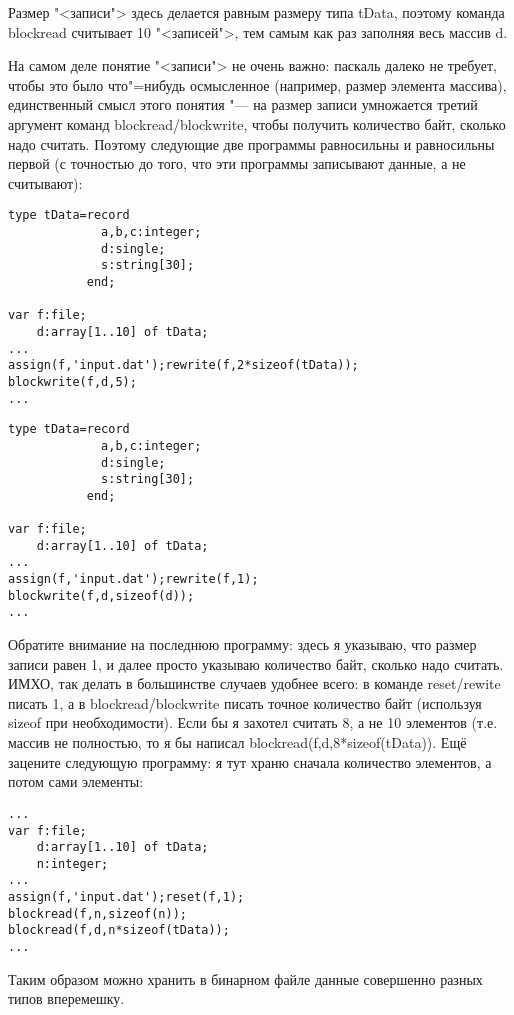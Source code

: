 Размер "<записи"> здесь делается равным размеру типа tData, поэтому команда blockread считывает 10 
"<записей">, тем самым как раз заполняя весь массив d.

\pagebreak[3]

На самом деле понятие "<записи"> не очень важно: паскаль далеко не требует, чтобы это было 
что"=нибудь осмысленное (например, размер элемента массива), единственный смысл этого понятия "--- 
на размер записи умножается третий аргумент команд blockread/blockwrite, чтобы получить количество 
байт, сколько надо считать. Поэтому следующие две программы равносильны и равносильны первой (с 
точностью до того, что эти программы записывают данные, а не считывают):
\begin{codesample}\begin{verbatim}
type tData=record
             a,b,c:integer;
             d:single;
             s:string[30];
           end;
           
var f:file;
    d:array[1..10] of tData;
...  
assign(f,'input.dat');rewrite(f,2*sizeof(tData));
blockwrite(f,d,5);
...
\end{verbatim}\end{codesample}
\begin{codesample}\begin{verbatim}
type tData=record
             a,b,c:integer;
             d:single;
             s:string[30];
           end;
           
var f:file;
    d:array[1..10] of tData;
...  
assign(f,'input.dat');rewrite(f,1);
blockwrite(f,d,sizeof(d));
...
\end{verbatim}\end{codesample}

Обратите внимание на последнюю программу: здесь я указываю, что размер записи равен 1, и далее 
просто указываю количество байт, сколько надо считать. ИМХО, так делать в большинстве случаев 
удобнее всего: в команде reset/rewite писать 1, а в blockread/blockwrite писать точное количество 
байт (используя sizeof при необходимости). Если бы я захотел считать 8, а не 10 элементов (т.е. 
массив не полностью, то я бы написал blockread(f,d,8*sizeof(tData)). Ещё зацените следующую 
программу: я тут храню сначала количество элементов, а потом сами элементы:
\begin{codesample}\begin{verbatim}
...
var f:file;
    d:array[1..10] of tData;
    n:integer;
...  
assign(f,'input.dat');reset(f,1);
blockread(f,n,sizeof(n));
blockread(f,d,n*sizeof(tData));
...
\end{verbatim}\end{codesample}
Таким образом можно хранить в бинарном файле данные совершенно разных типов вперемешку.

